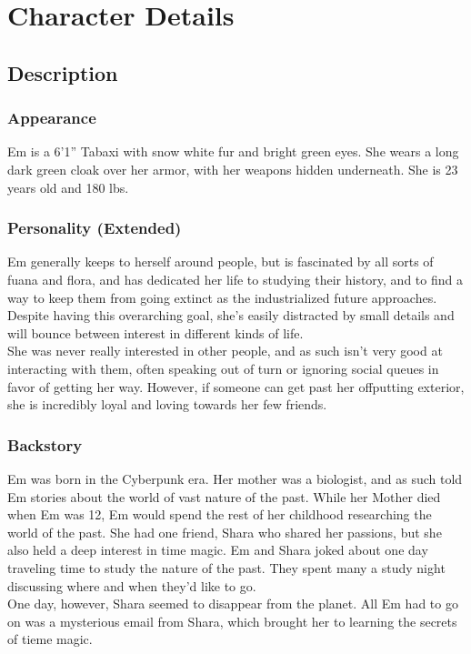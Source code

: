\documentclass[a4paper,openany,twocolumn]{book}
\begin{document}
\onecolumn






\restoregeometry
\twocolumn
\chapter*{Character Details}
\section*{Description}
\subsection*{Appearance}
Em is a 6'1'' Tabaxi with snow white fur and bright green eyes. She wears
a long dark green cloak over her armor, with her weapons hidden underneath. She
is 23 years old and 180 lbs.
\subsection*{Personality (Extended)}
Em generally keeps to herself around people, but is fascinated by all sorts of
fuana and flora, and has dedicated her life to studying their history, and to
find a way to keep them from going extinct as the industrialized future
approaches. Despite having this overarching goal, she's easily distracted by
small details and will bounce between interest in different kinds of life. \\
She was never really interested in other people, and as such isn't very good at
interacting with them, often speaking out of turn or ignoring social queues in
favor of getting her way. However, if someone can get past her offputting
exterior, she is incredibly loyal and loving towards her few friends.
\subsection*{Backstory}
Em was born in the Cyberpunk era. Her mother was a biologist, and as such told
Em stories about the world of vast nature of the past. While her Mother died
when Em was 12, Em would spend the rest of her childhood researching the world
of the past. She had one friend, Shara who shared her passions, but she also
held a deep interest in time magic. Em and Shara joked about one day traveling
time to study the nature of the past. They spent many a study night discussing
where and when they'd like to go. \\ One day, however, Shara seemed to disappear
from the planet. All Em had to go on was a mysterious email from Shara, which
brought her to learning the secrets of tieme magic.
\end{document}
